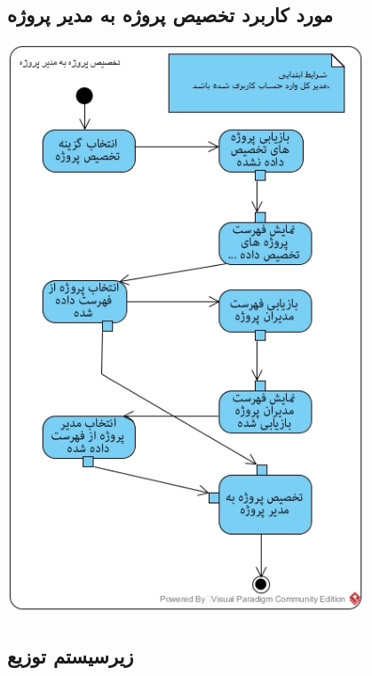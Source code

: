 \subsection*{مورد کاربرد تخصیص پروژه به مدیر پروژه}
\vspace{1cm}
\begin{center}
\includegraphics[width=0.8\textwidth]{ActivityDiagrams/34.jpg}
\end{center}


\subsection{زیرسیستم توزیع}
\vspace{1cm}
